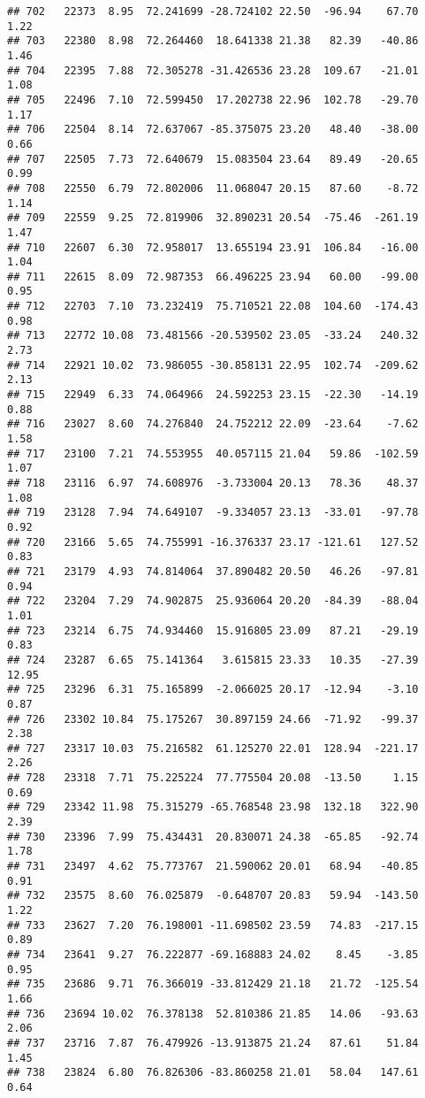 \documentclass[]{article}
\begin{document}
\begin{verbatim}
## 702   22373  8.95  72.241699 -28.724102 22.50  -96.94    67.70  1.22
## 703   22380  8.98  72.264460  18.641338 21.38   82.39   -40.86  1.46
## 704   22395  7.88  72.305278 -31.426536 23.28  109.67   -21.01  1.08
## 705   22496  7.10  72.599450  17.202738 22.96  102.78   -29.70  1.17
## 706   22504  8.14  72.637067 -85.375075 23.20   48.40   -38.00  0.66
## 707   22505  7.73  72.640679  15.083504 23.64   89.49   -20.65  0.99
## 708   22550  6.79  72.802006  11.068047 20.15   87.60    -8.72  1.14
## 709   22559  9.25  72.819906  32.890231 20.54  -75.46  -261.19  1.47
## 710   22607  6.30  72.958017  13.655194 23.91  106.84   -16.00  1.04
## 711   22615  8.09  72.987353  66.496225 23.94   60.00   -99.00  0.95
## 712   22703  7.10  73.232419  75.710521 22.08  104.60  -174.43  0.98
## 713   22772 10.08  73.481566 -20.539502 23.05  -33.24   240.32  2.73
## 714   22921 10.02  73.986055 -30.858131 22.95  102.74  -209.62  2.13
## 715   22949  6.33  74.064966  24.592253 23.15  -22.30   -14.19  0.88
## 716   23027  8.60  74.276840  24.752212 22.09  -23.64    -7.62  1.58
## 717   23100  7.21  74.553955  40.057115 21.04   59.86  -102.59  1.07
## 718   23116  6.97  74.608976  -3.733004 20.13   78.36    48.37  1.08
## 719   23128  7.94  74.649107  -9.334057 23.13  -33.01   -97.78  0.92
## 720   23166  5.65  74.755991 -16.376337 23.17 -121.61   127.52  0.83
## 721   23179  4.93  74.814064  37.890482 20.50   46.26   -97.81  0.94
## 722   23204  7.29  74.902875  25.936064 20.20  -84.39   -88.04  1.01
## 723   23214  6.75  74.934460  15.916805 23.09   87.21   -29.19  0.83
## 724   23287  6.65  75.141364   3.615815 23.33   10.35   -27.39 12.95
## 725   23296  6.31  75.165899  -2.066025 20.17  -12.94    -3.10  0.87
## 726   23302 10.84  75.175267  30.897159 24.66  -71.92   -99.37  2.38
## 727   23317 10.03  75.216582  61.125270 22.01  128.94  -221.17  2.26
## 728   23318  7.71  75.225224  77.775504 20.08  -13.50     1.15  0.69
## 729   23342 11.98  75.315279 -65.768548 23.98  132.18   322.90  2.39
## 730   23396  7.99  75.434431  20.830071 24.38  -65.85   -92.74  1.78
## 731   23497  4.62  75.773767  21.590062 20.01   68.94   -40.85  0.91
## 732   23575  8.60  76.025879  -0.648707 20.83   59.94  -143.50  1.22
## 733   23627  7.20  76.198001 -11.698502 23.59   74.83  -217.15  0.89
## 734   23641  9.27  76.222877 -69.168883 24.02    8.45    -3.85  0.95
## 735   23686  9.71  76.366019 -33.812429 21.18   21.72  -125.54  1.66
## 736   23694 10.02  76.378138  52.810386 21.85   14.06   -93.63  2.06
## 737   23716  7.87  76.479926 -13.913875 21.24   87.61    51.84  1.45
## 738   23824  6.80  76.826306 -83.860258 21.01   58.04   147.61  0.64

\end{verbatim}
\end{document}
